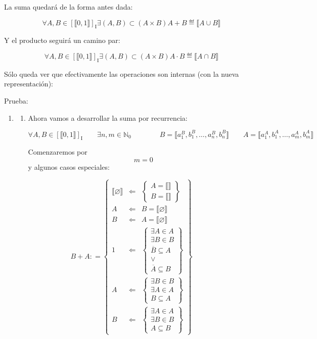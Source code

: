 \begin{enumerate}
  La suma quedará de la forma antes dada:

  \[\forall A,{B \in \left\lbrack {⟦0,1⟧} \right\rbrack_{\mathbf{\mathrm{I}}}}\exists{\left( {A,B} \right) \subset \left( {A \times B} \right)}{A + B} ≝ {⟦{A \cup B}⟧}\]

  Y el producto seguirá un camino par:

  \[\forall A,{B \in \left\lbrack {⟦0,1⟧} \right\rbrack_{\mathbf{\mathrm{I}}}}\exists{\left( {A,B} \right) \subset \left( {A \times B} \right)}{A \cdot B} ≝ {⟦{A \cap B}⟧}\]

  Sólo queda ver que efectivamente las operaciones son internas (con la
  nueva representación):

  Prueba:

  \begin{enumerate}
  \def\labelenumii{\arabic{enumii}.}
  \item
    \begin{enumerate}
    \def\labelenumiii{\arabic{enumiii}.}
    \item
      Ahora vamos a desarrollar la suma por recurrencia:

      \[\forall A,{B \in \left\lbrack {⟦0,1⟧} \right\rbrack_{\mathbf{\mathrm{I}}}}\qquad\exists n,{m \in {\mathbb{N}}_{0}}\mspace{72mu}{B = {⟦{a_{1}^{B},b_{1}^{B},\ldots,a_{n}^{B},b_{n}^{B}}⟧}}\qquad{A = {⟦{a_{1}^{A},b_{1}^{A},\ldots,a_{m}^{A},b_{m}^{A}}⟧}}\]

      Comenzaremos por \[m = 0\]y algunos casos especiales:
    \end{enumerate}
  \end{enumerate}

  \[{{B + A}{: =}}\begin{Bmatrix}
  {⟦\varnothing ⟧} & {\Leftarrow} & \begin{Bmatrix}
  {A = {⟦⟧}} \\
  {B = {⟦⟧}}
  \end{Bmatrix} \\
  A & {\Leftarrow} & {B = {⟦\varnothing ⟧}} \\
  B & {\Leftarrow} & {A = {⟦\varnothing ⟧}} \\
  1 & {\Leftarrow} & \begin{Bmatrix}
  {\exists{A \in A}} \\
  {\exists{B \in B}} \\
  {\overline{B} \subseteq A} \\
   \vee \\
  {\overline{A} \subseteq B}
  \end{Bmatrix} \\
  A & {\Leftarrow} & \begin{Bmatrix}
  {\exists{B \in B}} \\
  {\exists{A \in A}} \\
  {B \subseteq A}
  \end{Bmatrix} \\
  B & {\Leftarrow} & \begin{Bmatrix}
  {\exists{A \in A}} \\
  {\exists{B \in B}} \\
  {A \subseteq B}
  \end{Bmatrix}
  \end{Bmatrix}\]


\end{enumerate}
